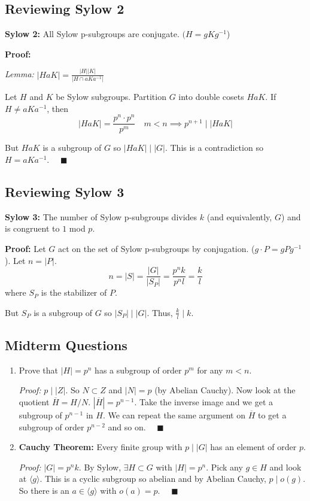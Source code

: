 \documentclass[12pt]{report}
\newcommand{\qed}{\quad \blacksquare}
\newcommand{\abs}[1]{\left\vert #1 \right\vert}
\begin{document}
    \subsection*{Reviewing Sylow 2}
        \textbf{Sylow 2:} All Sylow p-subgroups are conjugate. $(H = gKg^{-1}$)

        \textbf{Proof:} 
        
        \emph{Lemma:} $\abs{HaK} = \frac{\abs H \abs K}{\abs{H \cap aKa^{-1}}}$

        Let $H$ and $K$ be Sylow subgroups. Partition $G$ into double cosets $HaK$. If $H \neq aKa^{-1}$, then 
        \[\abs{HaK} = \frac{p^n \cdot p^n}{p^m} \quad m < n \implies p^{n+1} \mid \abs{HaK}\]

        But $HaK$ is a subgroup of $G$ so $\abs{HaK} \mid \abs{G}$. This is a contradiction so $H = aKa^{-1}$. $\qed$
        

    \subsection*{Reviewing Sylow 3}
        \textbf{Sylow 3:} The number of Sylow p-subgroups divides $k$ (and equivalently, $G$) and is congruent to $1$ mod $p$.

        \textbf{Proof:} Let $G$ act on the set of Sylow p-subgroups by conjugation. ($g\cdot P = gPg^{-1}$). Let $n= \abs{P}$.
        \[n = \abs{S} = \frac{\abs{G}}{\abs{S_P}} = \frac{p^nk}{p^n l} = \frac{k}{l}\] 
        where $S_P$ is the stabilizer of $P$.

        But $S_P$ is a subgroup of $G$ so $\abs{S_P} \mid \abs{G}$. Thus, $\frac{k}{l} \mid k$.

    \subsection*{Midterm Questions}
        \begin{enumerate}
            \item Prove that $\abs H = p^n$ has a subgroup of order $p^{m}$ for any $m < n$. 
            
            \emph{Proof:} $p \mid \abs{Z}$. So $N \subset Z$ and $\abs{N} = p$ (by Abelian Cauchy). Now look at the quotient $\overline H = H/N$. $\abs{\overline H} = p^{n-1}$. Take the inverse image and we get a subgroup of $p^{n-1}$ in $H$. We can repeat the same argument on $\overline H$ to get a subgroup of order $p^{n-2}$ and so on. $\qed$

            \item \textbf{Cauchy Theorem:} Every finite group with $p \mid \abs{G}$ has an element of order $p$. 
            
            \emph{Proof:} $\abs{G} = p^n k$. By Sylow, $\exists H \subset G$ with $\abs{H} = p^n$. Pick any $g \in H$ and look at $\langle g \rangle$. This is a cyclic subgroup so abelian and by Abelian Cauchy, $p \mid o(g)$. So there is an $a \in \langle g \rangle$ with $o(a) = p$. $\qed$
        \end{enumerate}
\end{document}
